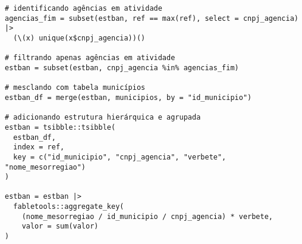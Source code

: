 \begin{anexosenv}
\begin{lstlisting}[frame=single]
# identificando agências em atividade
agencias_fim = subset(estban, ref == max(ref), select = cnpj_agencia) |>
  (\(x) unique(x$cnpj_agencia))()

# filtrando apenas agências em atividade
estban = subset(estban, cnpj_agencia %in% agencias_fim)

# mesclando com tabela municípios
estban_df = merge(estban, municipios, by = "id_municipio")

# adicionando estrutura hierárquica e agrupada
estban = tsibble::tsibble(
  estban_df,
  index = ref,
  key = c("id_municipio", "cnpj_agencia", "verbete", "nome_mesorregiao")
)

estban = estban |>
  fabletools::aggregate_key(
    (nome_mesorregiao / id_municipio / cnpj_agencia) * verbete,
    valor = sum(valor)
)
\end{lstlisting}

\end{anexosenv}

\printindex
